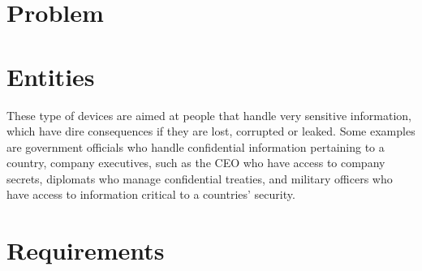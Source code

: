 \cleardoublepage
\label{chap:problem}


\section{Problem} \label{chap:problem:problem}




\section{Entities} \label{chap:problem:entities}

These type of devices are aimed at people that handle very sensitive information, which have dire consequences if they are lost, corrupted or leaked.
Some examples are government officials who handle confidential information pertaining to a country, company executives, such as the CEO who have access to company secrets, diplomats who manage confidential treaties, and military officers who have access to information critical to a countries' security.


\section{Requirements} \label{chap:problem:requirements}

